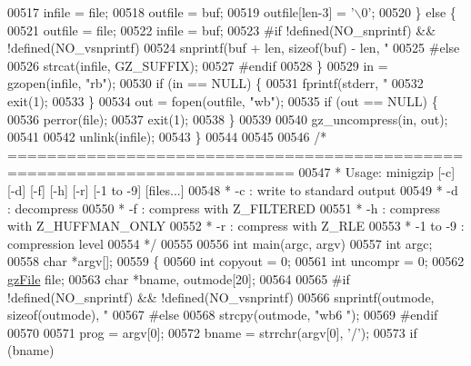 \begin{DoxyCode}
{{{{{{{{{00517         infile = file;
00518         outfile = buf;
00519         outfile[len-3] = \textcolor{charliteral}{'\(\backslash\)0'};
00520     \} \textcolor{keywordflow}{else} \{
00521         outfile = file;
00522         infile = buf;
00523 \textcolor{preprocessor}{#if !defined(NO\_snprintf) && !defined(NO\_vsnprintf)}
00524         snprintf(buf + len, \textcolor{keyword}{sizeof}(buf) - len, \textcolor{stringliteral}{"%
00525 \textcolor{preprocessor}{#else}
00526         strcat(infile, GZ\_SUFFIX);
00527 \textcolor{preprocessor}{#endif}
00528     \}
00529     in = gzopen(infile, \textcolor{stringliteral}{"rb"});
00530     \textcolor{keywordflow}{if} (in == NULL) \{
00531         fprintf(stderr, \textcolor{stringliteral}{"%
00532         exit(1);
00533     \}
00534     out = fopen(outfile, \textcolor{stringliteral}{"wb"});
00535     \textcolor{keywordflow}{if} (out == NULL) \{
00536         perror(file);
00537         exit(1);
00538     \}
00539 
00540     gz\_uncompress(in, out);
00541 
00542     unlink(infile);
00543 \}
00544 
00545 
00546 \textcolor{comment}{/* ===========================================================================}
00547 \textcolor{comment}{ * Usage:  minigzip [-c] [-d] [-f] [-h] [-r] [-1 to -9] [files...]}
00548 \textcolor{comment}{ *   -c : write to standard output}
00549 \textcolor{comment}{ *   -d : decompress}
00550 \textcolor{comment}{ *   -f : compress with Z\_FILTERED}
00551 \textcolor{comment}{ *   -h : compress with Z\_HUFFMAN\_ONLY}
00552 \textcolor{comment}{ *   -r : compress with Z\_RLE}
00553 \textcolor{comment}{ *   -1 to -9 : compression level}
00554 \textcolor{comment}{ */}
00555 
00556 \textcolor{keywordtype}{int} main(argc, argv)
00557     \textcolor{keywordtype}{int} argc;
00558     \textcolor{keywordtype}{char} *argv[];
00559 \{
00560     \textcolor{keywordtype}{int} copyout = 0;
00561     \textcolor{keywordtype}{int} uncompr = 0;
00562     \hyperlink{structgz_file__s}{gzFile} file;
00563     \textcolor{keywordtype}{char} *bname, outmode[20];
00564 
00565 \textcolor{preprocessor}{#if !defined(NO\_snprintf) && !defined(NO\_vsnprintf)}
00566     snprintf(outmode, \textcolor{keyword}{sizeof}(outmode), \textcolor{stringliteral}{"%
00567 \textcolor{preprocessor}{#else}
00568     strcpy(outmode, \textcolor{stringliteral}{"wb6 "});
00569 \textcolor{preprocessor}{#endif}
00570 
00571     prog = argv[0];
00572     bname = strrchr(argv[0], \textcolor{charliteral}{'/'});
00573     \textcolor{keywordflow}{if} (bname)
}}}}}}}}}}}}
\end{DoxyCode}
